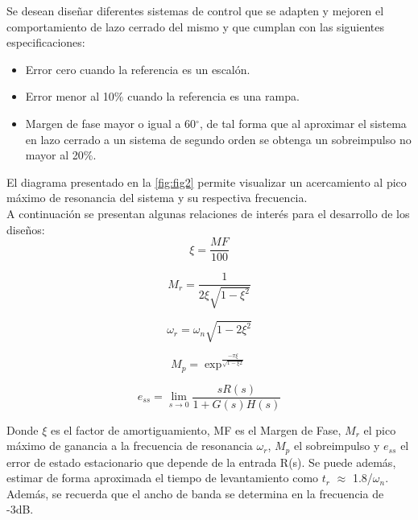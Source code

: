 \documentclass[12pt,letterpaper]{article}
\begin{document}
Se desean diseñar diferentes sistemas de control que se adapten y mejoren el comportamiento de lazo cerrado del mismo y que cumplan con las siguientes especificaciones:

\begin{itemize}
    \item Error cero cuando la referencia es un escalón.
    \item Error menor al 10$\%$ cuando la referencia es una rampa.
    \item Margen de fase mayor o igual a 60$^\circ$, de tal forma que al aproximar el sistema en lazo cerrado a un sistema de segundo orden se obtenga un sobreimpulso no mayor al 20$\%$.
\end{itemize}

El diagrama presentado en la \ref{fig:fig2} permite visualizar un acercamiento al pico máximo de resonancia del sistema y su respectiva frecuencia.\\

A continuación se presentan algunas relaciones de interés para el desarrollo de los diseños:\\

\begin{equation}
    \xi = \frac{MF}{100}
\end{equation}

\begin{equation}
    M_r = \frac{1}{2\xi\sqrt{1-\xi^2}}
\end{equation}

\begin{equation}
    \omega_r = \omega_n \sqrt{1-2\xi^2}
\end{equation}

\begin{equation}
    M_p = \exp^\frac{-\pi\xi}{\sqrt{1-\xi2}}
\end{equation}


\begin{equation}
    e_{ss}= \lim_{s \to 0} \frac{sR(s)}{1+G(s)H(s)}
\end{equation}


Donde $\xi$ es el factor de amortiguamiento, MF es el Margen de Fase, $M_r$ el pico máximo de ganancia a la frecuencia de resonancia $\omega_r$, $M_p$ el sobreimpulso y $e_{ss}$ el error de estado estacionario que depende de la entrada R(s). Se puede además, estimar de forma aproximada el tiempo de levantamiento como $t_r$ $\approx$ 1.8/$\omega_n$. Además, se recuerda que el ancho de banda se determina en la frecuencia de -3dB.\\
\end{document}
